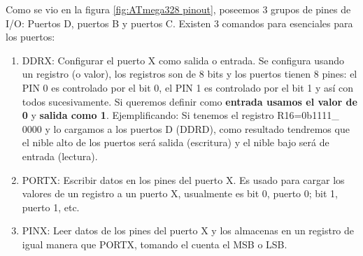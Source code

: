 \documentclass[
	12pt, %
	fleqn, %
	a4paper, %
]{LegrandOrangeBook}
\begin{document}
\begin{definition}
Como se vio en la figura \ref{fig:ATmega328 pinout}, poseemos 3 grupos de pines de I/O: Puertos D, puertos B y puertos C. Existen 3 comandos para esenciales para los puertos:
\begin{enumerate}
\item DDRX: Configurar el puerto X como salida o entrada. Se configura usando un registro (o valor), los registros son de 8 bits y los puertos tienen 8 pines: el PIN 0 es controlado por el bit 0, el PIN 1 es controlado por el bit 1 y así con todos sucesivamente. Si queremos definir como \textbf{entrada usamos el valor de 0} y \textbf{salida como 1}. Ejemplificando: Si tenemos el registro R16=0b1111\_ 0000 y lo cargamos a los puertos D (DDRD), como resultado tendremos que el nible alto de los puertos será salida (escritura) y el nible bajo será de entrada (lectura).
\item PORTX: Escribir datos en los pines del puerto X. Es usado para cargar los valores de un registro a un puerto X, usualmente es bit 0, puerto 0; bit 1, puerto 1, etc.
\item PINX: Leer datos de los pines del puerto X y los almacenas en un registro de igual manera que PORTX, tomando el cuenta el MSB o LSB.
\end{enumerate}
\end{definition}
\end{document}
